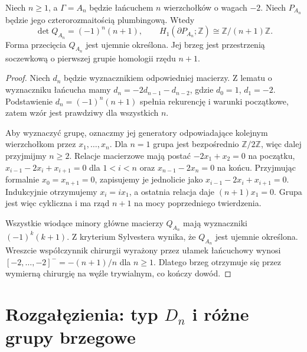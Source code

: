 \begin{twierdzenie}
\label{thm:tg-plumbing-An}
Niech $n\ge1$, a $\Gamma=A_n$ będzie łańcuchem
$n$ wierzchołków o wagach $-2$. Niech $P_{A_n}$
będzie jego czterorozmaitością plumbingową. Wtedy
\[
\det Q_{A_n}=(-1)^n(n+1),\qquad
H_1(\partial P_{A_n};\mathbb Z)\cong\mathbb Z/(n+1)\mathbb Z.
\]
Forma przecięcia $Q_{A_n}$ jest ujemnie określona.
Jej brzeg jest przestrzenią soczewkową o pierwszej
grupie homologii rzędu $n+1$.
\end{twierdzenie}
\begin{proof}
Niech $d_n$ będzie wyznacznikiem odpowiedniej macierzy.
Z lematu o wyznaczniku łańcucha mamy
$d_n=-2d_{n-1}-d_{n-2}$, gdzie $d_0=1$, $d_1=-2$.
Podstawienie $d_n=(-1)^n(n+1)$ spełnia rekurencję
i warunki początkowe, zatem wzór jest prawdziwy dla
wszystkich $n$.

Aby wyznaczyć grupę, oznaczmy jej generatory odpowiadające
kolejnym wierzchołkom przez $x_1,\dots,x_n$. Dla $n=1$ grupa jest bezpośrednio
$\mathbb Z/2\mathbb Z$, więc dalej przyjmijmy $n\ge2$.
Relacje
macierzowe mają postać
$-2x_1+x_2=0$ na początku,
$x_{i-1}-2x_i+x_{i+1}=0$ dla $1<i<n$ oraz
$x_{n-1}-2x_n=0$ na końcu.
Przyjmując formalnie $x_0=x_{n+1}=0$, zapisujemy je
jednolicie jako $x_{i-1}-2x_i+x_{i+1}=0$.
Indukcyjnie otrzymujemy $x_i=i x_1$, a ostatnia relacja
daje $(n+1)x_1=0$. Grupa jest więc cykliczna i ma
rząd $n+1$ na mocy poprzedniego twierdzenia.

Wszystkie wiodące minory główne macierzy $Q_{A_n}$
mają wyznaczniki $(-1)^k(k+1)$. Z kryterium Sylvestera
wynika, że $Q_{A_n}$ jest ujemnie określona.
Wreszcie współczynnik chirurgii wyrażony przez ułamek
łańcuchowy wynosi
$[-2,\dots,-2]^-=-(n+1)/n$ dla $n\ge1$.
Dlatego brzeg otrzymuje się przez wymierną chirurgię
na węźle trywialnym, co kończy dowód.
\end{proof}

\begin{center}
\end{center}

\section{Rozgałęzienia: typ \texorpdfstring{$D_n$}{Dn} i różne grupy brzegowe}
\label{sec:tg-plumbing-Dn}


